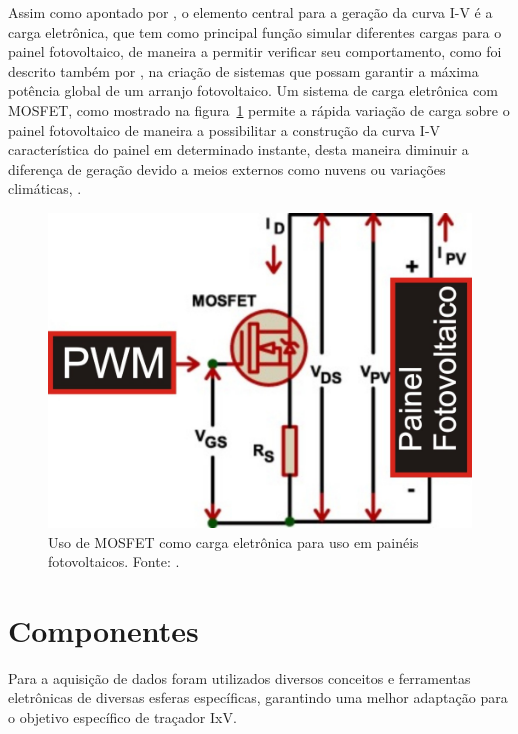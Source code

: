 Assim como apontado por , o elemento central para a geração da curva I-V é a carga eletrônica, que tem como principal função simular diferentes cargas para o painel fotovoltaico, de maneira a permitir verificar seu comportamento, como foi descrito também por , na criação de sistemas que possam garantir a máxima potência global de um arranjo fotovoltaico. Um sistema de carga eletrônica com MOSFET, como mostrado na figura~\ref{fig:CargaELE} permite a rápida variação de carga sobre o painel fotovoltaico de maneira a possibilitar a construção da curva I-V característica do painel em determinado instante, desta maneira diminuir a diferença de geração devido a meios externos como nuvens ou variações climáticas, \cite{WILLOUGHBY2018171}.%

\FloatBarrier
\begin{figure}[!htbp]
	\centering
	\includegraphics[scale=1]{imagens/MOSFET_LOAD}
	\caption{Uso de MOSFET como carga eletrônica para uso em painéis fotovoltaicos. Fonte: . }
	
	\label{fig:CargaELE}
\end{figure}
\FloatBarrier

\section{Componentes}

Para a aquisição de dados foram utilizados diversos conceitos e ferramentas eletrônicas de diversas esferas específicas, garantindo uma melhor adaptação para o objetivo específico de traçador IxV.%

